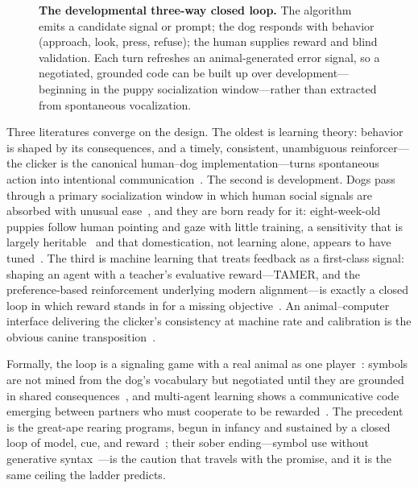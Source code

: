\begin{figure}[t]
\centering
\resizebox{0.82\textwidth}{!}{}
\caption{\textbf{The developmental three-way closed loop.} The algorithm
emits a candidate signal or prompt; the dog responds with behavior
(approach, look, press, refuse); the human supplies reward and blind
validation. Each turn refreshes an animal-generated error signal, so a
negotiated, grounded code can be built up over development---beginning in
the puppy socialization window---rather than extracted from spontaneous
vocalization.}
\label{fig:loop}
\end{figure}

Three literatures converge on the design. The oldest is learning theory:
behavior is shaped by its consequences, and a timely, consistent,
unambiguous reinforcer---the clicker is the canonical human--dog
implementation---turns spontaneous action into intentional
communication~\cite{skinner1953science,pryor1999dont}. The second is
development. Dogs pass through a primary socialization window in which human
social signals are absorbed with unusual
ease~\cite{scott1965genetics,freedman1961critical,serpell1995early}, and they
are born ready for it: eight-week-old puppies follow human pointing and gaze
with little training, a sensitivity that is largely
heritable~\cite{topal2009differential,bray2021early} and that domestication,
not learning alone, appears to have tuned~\cite{hare2002domestication,miklosi2003lookback,udell2010what}.
The third is machine learning that treats feedback as a first-class signal:
shaping an agent with a teacher's evaluative reward---TAMER, and the
preference-based reinforcement underlying modern
alignment---is exactly a closed loop in which reward stands in for a missing
objective~\cite{knox2009tamer,christiano2017preferences}. An
animal--computer interface delivering the clicker's consistency at machine
rate and calibration is the obvious canine transposition~\cite{mancini2011aci}.

Formally, the loop is a signaling game with a real animal as one
player~\cite{lewis1969convention}: symbols are not mined from the dog's
vocabulary but negotiated until they are grounded in shared
consequences~\cite{steels2003evolving,kirby2008cumulative,smith2003iterated},
and multi-agent learning shows a communicative code emerging between partners
who must cooperate to be rewarded~\cite{lazaridou2017emergence,foerster2016communicate}.
The precedent is the great-ape rearing programs, begun in infancy and
sustained by a closed loop of model, cue, and
reward~\cite{gardner1969teaching,savage1994kanzi}; their sober ending---symbol
use without generative syntax~\cite{terrace1979ape}---is the caution that
travels with the promise, and it is the same ceiling the ladder predicts.

